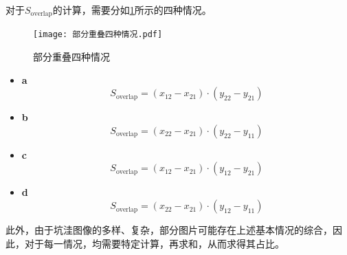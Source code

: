 \documentclass{MathorCupmodeling}
\begin{document}
\begin{itemize}
		对于$S_{\text{overlap}}$的计算，需要分如\textcolor{blue}{\cref{fig:部分重叠四种情况}}所示的四种情况。
		\begin{figure}[H]
			\centering
			\texttt{[image: 部分重叠四种情况.pdf]}
			\caption{部分重叠四种情况}
			\label{fig:部分重叠四种情况}
		\end{figure}
		\begin{itemize}
			\item \textbf{a}
			\begin{equation}
				S_{\text{overlap}}=\left(x_{12}-x_{21}\right)\cdot\left(y_{22}-y_{21}\right)
			\end{equation}
			\item \textbf{b}
			\begin{equation}
				S_{\text{overlap}}=\left(x_{22}-x_{21}\right)\cdot\left(y_{22}-y_{11}\right)
			\end{equation}
			\item \textbf{c}
			\begin{equation}
				S_{\text{overlap}}=\left(x_{12}-x_{21}\right)\cdot\left(y_{12}-y_{21}\right)
			\end{equation}
			\item \textbf{d}
			\begin{equation}
				S_{\text{overlap}}=\left(x_{22}-x_{21}\right)\cdot\left(y_{12}-y_{11}\right)
			\end{equation}
		\end{itemize}
	\end{itemize}

	此外，由于坑洼图像的多样、复杂，部分图片可能存在上述基本情况的综合，因此，对于每一情况，均需要特定计算，再求和，从而求得其占比。
	
\end{document}
